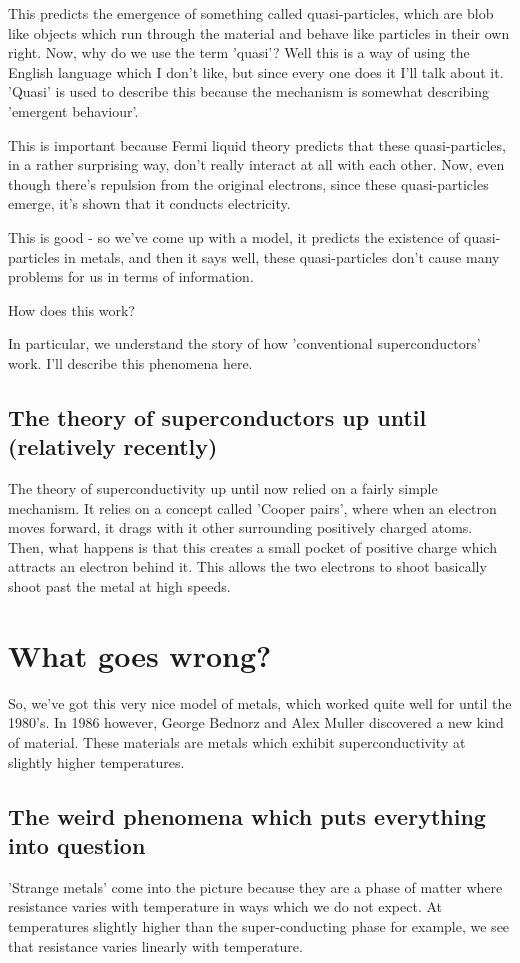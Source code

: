 \documentclass[11pt, oneside]{article}   	%
\theoremstyle{slanted}
\begin{document}
This predicts the emergence of something called quasi-particles, 
which are blob like objects which run through the material
and behave like particles in their own right. 
Now, why do we use the term 'quasi'? 
Well this is a way of using the English language which I 
don't like, but since every one does it I'll talk about it. 
'Quasi' is used to describe this because the mechanism 
is somewhat describing 'emergent behaviour'. 

This is important because Fermi liquid theory predicts that 
these quasi-particles, in a rather surprising way, don't
really interact at all with each other. 
Now, even though there's 
repulsion from the original electrons, since 
these quasi-particles emerge, it's shown that 
it conducts electricity. 

This is good  - so we've come up with a model, it predicts 
the existence of quasi-particles in metals, and
then it says well, these quasi-particles don't cause many problems for us 
in terms of information. 


How does this work? 

In particular, we understand the story of how 'conventional superconductors' 
work. I'll describe this phenomena here. 

\subsection{The theory of superconductors up until (relatively recently)}
The theory of superconductivity up until now 
relied on a fairly simple mechanism. 
It relies on a concept called 'Cooper pairs', where 
when an electron moves forward, it drags with it
other surrounding positively charged atoms. 
Then, what happens is that this creates a small pocket of 
positive charge which attracts an electron behind it. 
This allows the two electrons to shoot basically shoot past the metal 
at high speeds. 

\section{What goes wrong?}
So, we've got this very nice model of metals, which worked 
quite well for until the 1980's. 
In 1986 however, George Bednorz and Alex Muller 
discovered a new kind of material. 
These materials are metals which exhibit superconductivity 
at slightly higher temperatures. 

\subsection{The weird phenomena which puts everything into question} 
'Strange metals' come into the picture because they are a phase 
of matter where resistance 
varies with temperature in ways which we do not expect. 
At temperatures slightly higher than the super-conducting phase for 
example, we see that resistance varies linearly with 
temperature. 
\end{document}
